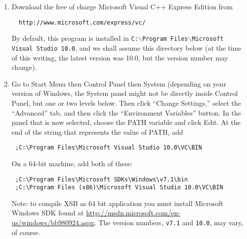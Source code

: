 \begin{enumerate}
\item Download the free of charge Microsoft Visual C++ Express Edition from
\begin{verbatim}
  http://www.microsoft.com/express/vc/ 
\end{verbatim}
By default, this program is installed in
\texttt{C:$\backslash$Program Files$\backslash$Microsoft Visual Studio 10.0},
and we shall assume this
directory below (at the time of this writing, the latest version was 10.0,
but the version number may change).
\item Go to Start Menu then Control Panel then System (depending on your
version of Windows, the System panel might not be directly inside Control
Panel, but one or two levels below. Then click ``Change Settings,'' select
the ``Advanced'' tab, and then click the ``Environment Variables'' button.
In the panel that is now selected,
choose the PATH variable and click Edit. At the end of the string that
represents the value of PATH, add
\begin{verbatim}
 ;C:\Program Files\Microsoft Visual Studio 10.0\VC\BIN
\end{verbatim}

On a 64-bit machine, add both of these:
\begin{verbatim}
 ;C:\Program Files\Microsoft SDKs\Windows\v7.1\bin
 ;C:\Program Files (x86)\Microsoft Visual Studio 10.0\VC\BIN
\end{verbatim}

Note: to compile XSB as 64 bit application you must install Microsoft
Windows SDK found at
\url{http://msdn.microsoft.com/en-us/windows/bb980924.aspx}.
The version numbers, \texttt{v7.1} and \texttt{10.0}, may vary, of course. 


\end{enumerate}
